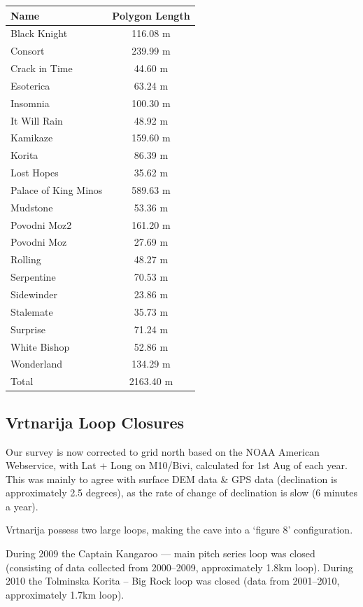 \documentclass[english,a4]{article}
\begin{document}
\begin{tabular}{l c}
Name & Polygon Length \\
\midrule
Black Knight & 116.08 m \\
Consort & 239.99 m \\
Crack in Time & 44.60 m \\
Esoterica & 63.24 m \\
Insomnia & 100.30 m \\
It Will Rain & 48.92 m \\
Kamikaze & 159.60 m \\
Korita & 86.39 m \\
Lost Hopes & 35.62 m \\
Palace of King Minos & 589.63 m \\
Mudstone & 53.36 m \\
Povodni Moz2 & 161.20 m \\
Povodni Moz & 27.69 m \\
Rolling & 48.27 m \\
Serpentine & 70.53 m \\
Sidewinder & 23.86 m \\
Stalemate & 35.73 m \\
Surprise & 71.24 m \\
White Bishop & 52.86 m \\
Wonderland & 134.29 m \\
\midrule
Total & 2163.40 m \\
\end{tabular}

\subsection{Vrtnarija Loop Closures}

Our survey is now corrected to grid north based on the NOAA American
Webservice, with Lat + Long on M10/Bivi, calculated for 1st Aug of each year.
This was mainly to agree with surface DEM data \& GPS data (declination is
approximately 2.5 degrees), as the rate of change of declination is slow (6
minutes a year).

Vrtnarija possess two large loops, making the cave into a `figure 8' configuration. 

During 2009 the Captain Kangaroo --- main pitch series loop was closed
(consisting of data collected from 2000--2009, approximately 1.8km loop).
During 2010 the Tolminska Korita -- Big Rock loop was closed (data from
2001--2010, approximately 1.7km loop).
\end{document}
